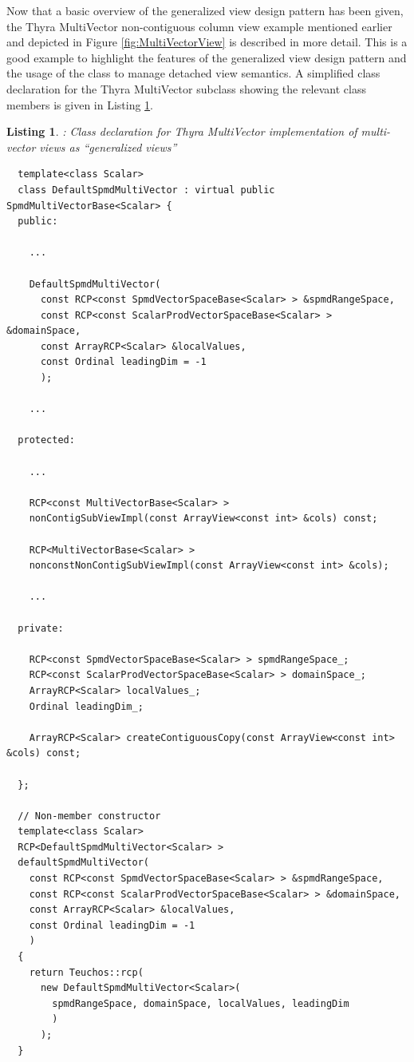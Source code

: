\documentclass[pdf,ps2pdf,11pt]{SANDreport}
\newtheorem{listing}{Listing}
\begin{document}
Now that a basic overview of the generalized view design pattern has
been given, the Thyra MultiVector non-contiguous column view example
mentioned earlier and depicted in Figure {}\ref{fig:MultiVectorView}
is described in more detail.  This is a good example to highlight the
features of the generalized view design pattern and the usage of the
{} class to manage detached view semantics.  A simplified
class declaration for the Thyra MultiVector subclass showing the
relevant class members is given in Listing
{}\ref{listing:DefaultSpmdMultiVector-decl}.


\begin{listing}:  Class declaration for Thyra MultiVector implementation
of multi-vector views as ``generalized views''  \\
\label{listing:DefaultSpmdMultiVector-decl}
{\small\begin{verbatim}
  template<class Scalar>
  class DefaultSpmdMultiVector : virtual public SpmdMultiVectorBase<Scalar> {
  public:
  
    ...
  
    DefaultSpmdMultiVector(
      const RCP<const SpmdVectorSpaceBase<Scalar> > &spmdRangeSpace,
      const RCP<const ScalarProdVectorSpaceBase<Scalar> > &domainSpace,
      const ArrayRCP<Scalar> &localValues,
      const Ordinal leadingDim = -1
      );
  
    ...
  
  protected:
  
    ...
  
    RCP<const MultiVectorBase<Scalar> >
    nonContigSubViewImpl(const ArrayView<const int> &cols) const;
  
    RCP<MultiVectorBase<Scalar> >
    nonconstNonContigSubViewImpl(const ArrayView<const int> &cols);
  
    ...
    
  private:
  
    RCP<const SpmdVectorSpaceBase<Scalar> > spmdRangeSpace_;
    RCP<const ScalarProdVectorSpaceBase<Scalar> > domainSpace_;
    ArrayRCP<Scalar> localValues_;
    Ordinal leadingDim_;
  
    ArrayRCP<Scalar> createContiguousCopy(const ArrayView<const int> &cols) const;
    
  };
  
  // Non-member constructor
  template<class Scalar>
  RCP<DefaultSpmdMultiVector<Scalar> >
  defaultSpmdMultiVector(
    const RCP<const SpmdVectorSpaceBase<Scalar> > &spmdRangeSpace,
    const RCP<const ScalarProdVectorSpaceBase<Scalar> > &domainSpace,
    const ArrayRCP<Scalar> &localValues,
    const Ordinal leadingDim = -1
    )
  {
    return Teuchos::rcp(
      new DefaultSpmdMultiVector<Scalar>(
        spmdRangeSpace, domainSpace, localValues, leadingDim
        )
      );
  }
\end{verbatim}}
\end{listing}
\end{document}
